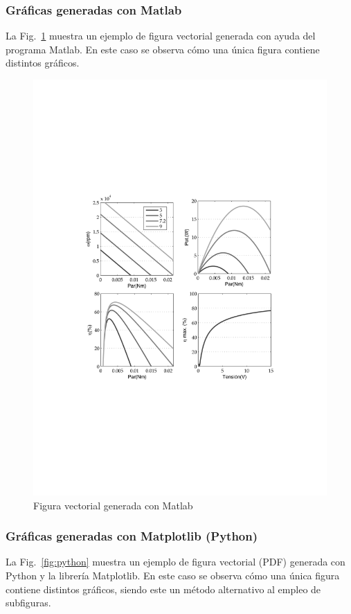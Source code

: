 \documentclass[11pt,a4paper]{article}
\begin{document}
\newpage
\subsubsection{Gráficas generadas con Matlab}
La Fig.~\ref{fig:matlabGrafs} muestra un ejemplo de figura vectorial generada con ayuda del programa Matlab. En este caso se observa cómo una única figura contiene distintos gráficos.

\begin{figure}[htb]
	\centering
	\includegraphics[width=0.8\linewidth]{matlabGrafs} 
	\caption[Gráfico de Matlab]{Figura vectorial generada con Matlab}
	\label{fig:matlabGrafs}
\end{figure}



\newpage
\subsubsection{Gráficas generadas con Matplotlib (Python)}
La Fig.~\ref{fig:python} muestra un ejemplo de figura vectorial (PDF) generada con Python y la librería \textsf{Matplotlib}. En este caso se observa cómo una única figura contiene distintos gráficos, siendo este un método alternativo al empleo de subfiguras.
\end{document}
